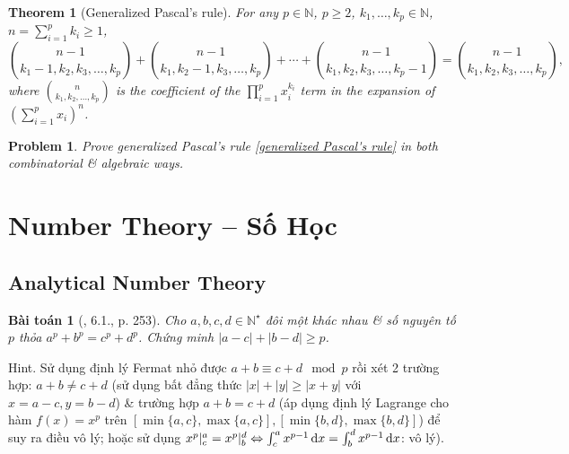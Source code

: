\documentclass{article}
\newtheorem{baitoan}{Bài toán}
\newtheorem{problem}{Problem}
\newtheorem{theorem}{Theorem}
\begin{document}
\begin{theorem}[Generalized Pascal's rule]
	For any $p\in\mathbb{N}$, $p\ge2$, $k_1,\ldots,k_p\in\mathbb{N}$, $n = \sum_{i=1}^p k_i\ge1$,
	\begin{equation}
		\label{generalized Pascal's rule}
		\tag{gPasr}
		\binom{n - 1}{k_1 - 1,k_2,k_3,\ldots,k_p} + \binom{n - 1}{k_1,k_2 - 1,k_3,\ldots,k_p} + \cdots + \binom{n - 1}{k_1,k_2,k_3,\ldots,k_p - 1} = \binom{n - 1}{k_1,k_2,k_3,\ldots,k_p},
	\end{equation}
	where $\binom{n}{k_1,k_2,\ldots,k_p}$ is the coefficient of the $\prod_{i=1}^p x_i^{k_i}$ term in the expansion of $\left(\sum_{i=1}^p x_i\right)^n$.
\end{theorem}

\begin{problem}
	Prove generalized Pascal's rule \eqref{generalized Pascal's rule} in both combinatorial \& algebraic ways.
\end{problem}


\section{Number Theory -- Số Học}



\subsection{Analytical Number Theory}

\begin{baitoan}[\cite{Quoc_Long_Dat_Nam_VMC}, 6.1., p. 253]
	Cho $a,b,c,d\in\mathbb{N}^\star$ đôi một khác nhau \& số nguyên tố $p$ thỏa $a^p + b^p = c^p + d^p$. Chứng minh $|a - c| + |b - d|\ge p$.
\end{baitoan}
{\sf Hint.} Sử dụng định lý Fermat nhỏ được $a + b\equiv c + d\mod p$ rồi xét 2 trường hợp: $a + b\ne c + d$ (sử dụng bất đẳng thức $|x| + |y|\ge|x + y|$ với $x = a - c,y = b - d$) \& trường hợp $a + b = c + d$ (áp dụng định lý Lagrange cho hàm $f(x) = x^p$ trên $[\min\{a,c\},\max\{a,c\}],[\min\{b,d\},\max\{b,d\}]$) để suy ra điều vô lý; hoặc sử dụng $x^p|_c^a = x^p|_b^d\Leftrightarrow\int_c^a x^{p-1}\,{\rm d}x = \int_b^d x^{p-1}\,{\rm d}x$: vô lý).
\end{document}

